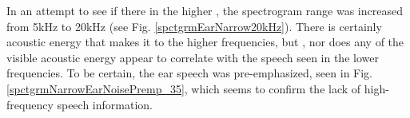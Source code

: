 In an attempt to see if there \DIFdelbegin {}\DIFdelend \DIFaddbegin {}\DIFaddend in the higher \DIFdelbegin {}\DIFdelend \DIFaddbegin {}\DIFaddend , the spectrogram range \DIFdelbegin {}\DIFdelend was increased from 5kHz to 20kHz (see Fig. \ref{spctgrmEarNarrow20kHz}). There is certainly acoustic energy that makes it to the higher frequencies, but \DIFdelbegin {}\DIFdelend \DIFaddbegin {}\DIFaddend , nor does any of the visible acoustic energy appear to correlate with the speech seen in the lower frequencies.
To be certain, the ear speech was pre-emphasized, seen in Fig. \ref{spctgrmNarrowEarNoisePremp_35}, which seems to confirm the lack of high-frequency speech information. 
